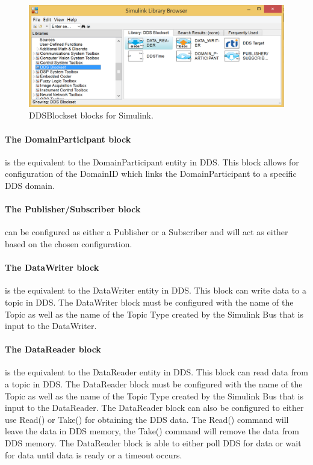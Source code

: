 \begin{figure}[h]
\includegraphics[width=\textwidth]{figures/DDSBlockset}
	\caption[DDSBlockset blocks for Simulink]{
		\label{fig:DDSBlocksetBlocks} 
		\footnotesize{%
			DDSBlockset blocks for Simulink.
		}
	}
\end{figure}


\paragraph{The DomainParticipant block} is the equivalent to the DomainParticipant entity in DDS. This block allows for configuration of the DomainID which links the DomainParticipant to a specific DDS domain.

\paragraph{The Publisher/Subscriber block} can be configured as either a Publisher or a Subscriber and will act as either based on the chosen configuration.

\paragraph{The DataWriter block} is the equivalent to the DataWriter entity in DDS. This block can write data to a topic in DDS. The DataWriter block must be configured with the name of the Topic as well as the name of the Topic Type created by the Simulink Bus that is input to the DataWriter.

\paragraph{The DataReader block} is the equivalent to the DataReader entity in DDS. This block can read data from a topic in DDS. The DataReader block must be configured with the name of the Topic as well as the name of the Topic Type created by the Simulink Bus that is input to the DataReader. The DataReader block can also be configured to either use Read() or Take() for obtaining the DDS data. The Read() command will leave the data in DDS memory, the Take() command will remove the data from DDS memory. The DataReader block is able to either poll DDS for data or wait for data until data is ready or a timeout occurs.

